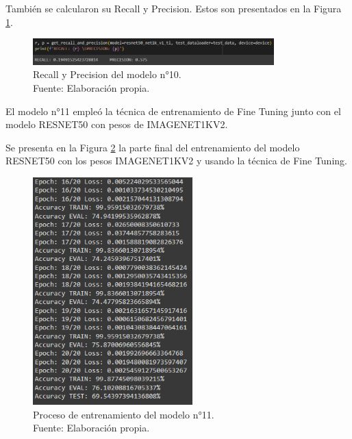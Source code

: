 También se calcularon su Recall y Precision. Estos son presentados en la Figura \ref{4:fig139}.

\begin{figure}[H]
	\begin{center}
		\includegraphics[width=0.83\textwidth]{4/figures/model10_rp.PNG}
		\caption[Recall y Precision del modelo n°10]{Recall y Precision del modelo n°10. \\
		Fuente: Elaboración propia.}
		\label{4:fig139}
	\end{center}
\end{figure}

El modelo n°11 empleó la técnica de entrenamiento de Fine Tuning junto con el modelo RESNET50 con pesos de IMAGENET1KV2.

Se presenta en la Figura \ref{4:fig140} la parte final del entrenamiento del modelo RESNET50 con los pesos IMAGENET1KV2 y usando la técnica de Fine Tuning.

\begin{figure}[H]
	\begin{center}
		\includegraphics[width=0.55\textwidth]{4/figures/model11_train.PNG}
		\caption[Proceso de entrenamiento del modelo n°11]{Proceso de entrenamiento del modelo n°11. \\
		Fuente: Elaboración propia.}
		\label{4:fig140}
	\end{center}
\end{figure}

